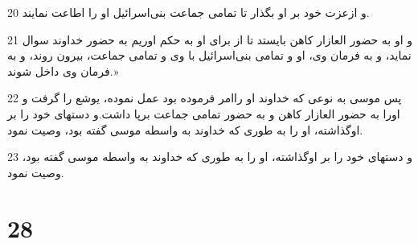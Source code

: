 \par 20 و ازعزت خود بر او بگذار تا تمامی جماعت بنی‌اسرائیل او را اطاعت نمایند.
\par 21 و او به حضور العازار کاهن بایستد تا از برای او به حکم اوریم به حضور خداوند سوال نماید، و به فرمان وی، او و تمامی بنی‌اسرائیل با وی و تمامی جماعت، بیرون روند، و به فرمان وی داخل شوند.»
\par 22 پس موسی به نوعی که خداوند او راامر فرموده بود عمل نموده، یوشع را گرفت و اورا به حضور العازار کاهن و به حضور تمامی جماعت برپا داشت.و دستهای خود را بر اوگذاشته، او را به طوری که خداوند به واسطه موسی گفته بود، وصیت نمود.
\par 23 و دستهای خود را بر اوگذاشته، او را به طوری که خداوند به واسطه موسی گفته بود، وصیت نمود.
 
\chapter{28}

